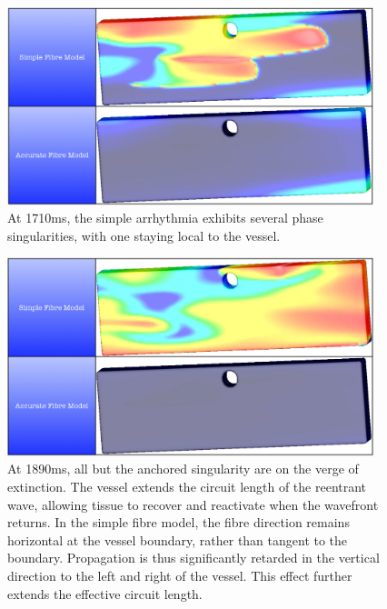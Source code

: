     \begin{figure}[htbp]
  		\centering
  	    \includegraphics[width=0.95\textwidth]{Ch4/Figs/shock_induced_1710ms}
              \caption{At 1710ms, the simple arrhythmia exhibits several phase singularities, with one staying local to the vessel.}
  	  \label{fig:shock_induced_1710ms}
  	\end{figure}
  	
    \begin{figure}[htbp]
  		\centering
  	    \includegraphics[width=0.95\textwidth]{Ch4/Figs/shock_induced_1890ms}
              \caption{At 1890ms, all but the anchored singularity are on the verge of extinction. The vessel extends the circuit length of the reentrant wave, allowing tissue to recover and reactivate when the wavefront returns. In the simple fibre model, the fibre direction remains horizontal at the vessel boundary, rather than tangent to the boundary. Propagation is thus significantly retarded in the vertical direction to the left and right of the vessel. This effect further extends the effective circuit length.}
  	  \label{fig:shock_induced_1890ms}
  	\end{figure}
  	
